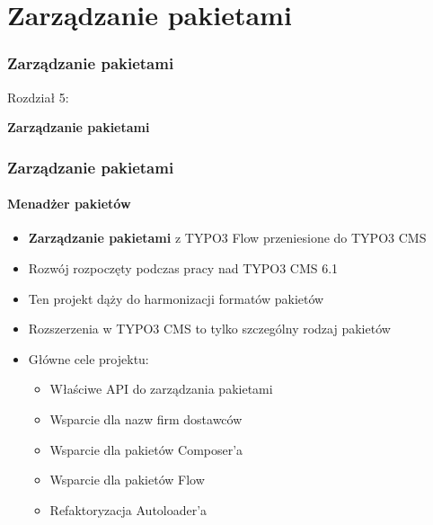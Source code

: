%
\section{Zarządzanie pakietami}
\begin{frame}[fragile]
	\frametitle{Zarządzanie pakietami}

	\begin{center}\huge{Rozdział 5:}\end{center}
	\begin{center}\huge{\color{typo3darkgrey}\textbf{Zarządzanie pakietami}}\end{center}

\end{frame}


	\begin{frame}[fragile]
	\frametitle{Zarządzanie pakietami}
	\framesubtitle{Menadżer pakietów}

	\begin{itemize}
		\item \textbf{Zarządzanie pakietami} z TYPO3 Flow przeniesione do TYPO3 CMS
		\item Rozwój rozpoczęty podczas pracy nad TYPO3 CMS 6.1
		\item Ten projekt dąży do harmonizacji formatów pakietów
		\item Rozszerzenia w TYPO3 CMS to tylko szczególny rodzaj pakietów
		\item Główne cele projektu:

			\begin{itemize}
				\item Właściwe API do zarządzania pakietami
				\item Wsparcie dla nazw firm dostawców
				\item Wsparcie dla pakietów Composer'a
				\item Wsparcie dla pakietów Flow
				\item Refaktoryzacja Autoloader'a
			\end{itemize}

	\end{itemize}

\end{frame}

